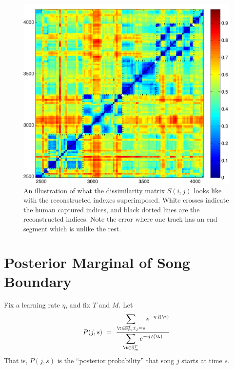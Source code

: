 \documentclass[twocolumn]{article}
\DeclareMathOperator{\loss}{\ell}
\newcommand{\segs}{\mathbb S}
\begin{document}
\begin{figure}[t]
\centering
\includegraphics[width=\textwidth]{images/simmat_preds}

\caption{An illustration of what the dissimilarity matrix $S(i,j)$ looks like with the reconstructed indexes superimposed. White crosses indicate the human captured indices, and black dotted lines are the reconstructed indices. Note the error where one track has an end segment which is unlike the rest. }
\label{fig:predictions}
\end{figure} 


 

\section{Posterior Marginal of Song Boundary}
Fix a learning rate $\eta$, and fix $T$ and $M$. Let
\[
P(j,s) ~=~ 
\frac{\displaystyle
	\sum_{\t \in \segs^T_m : t_j = s} e^{- \eta \loss(\t)}
}{\displaystyle
\sum_{\t \in \segs^T_m} e^{- \eta \loss(\t)}
}
\]
That is, $P(j,s)$ is the ``posterior probability'' that song $j$ starts at time $s$.
\end{document}
